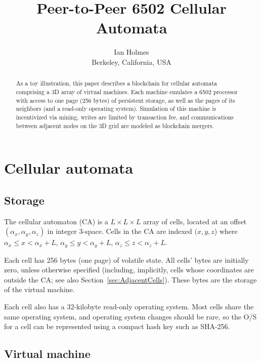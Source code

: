 \documentclass{article}
\begin{document}
\title{Peer-to-Peer 6502 Cellular Automata}
\author{Ian Holmes \\ Berkeley, California, USA}

\maketitle


\begin{abstract}
  As a toy illustration,
  this paper describes a blockchain for cellular automata
  comprising a 3D array of virtual machines.
  Each machine emulates a 6502 processor with access to one page (256 bytes) of persistent storage,
  as well as the pages of its neighbors (and a read-only operating system).
  Simulation of this machine is incentivized via mining,
  writes are limited by transaction fee,
  and communications between adjacent nodes on the 3D grid are modeled as blockchain mergers.
\end{abstract}

\section{Cellular automata}

\subsection{Storage}
\label{sec:Storage}

The cellular automaton (CA) is a $L \times L \times L$ array of cells,
located at an offset $(\alpha_x,\alpha_y,\alpha_z)$ in integer 3-space.
Cells in the CA are indexed $(x,y,z$) where
$\alpha_x \leq x < \alpha_x+L$,
$\alpha_y \leq y < \alpha_y+L$,
$\alpha_z \leq z < \alpha_z+L$.

Each cell has 256 bytes (one page) of volatile state.
All cells' bytes are initially zero, unless otherwise specified
(including, implicitly, cells whose coordinates are outside the CA; see also Section~\ref{sec:AdjacentCells}).
These bytes are the storage of the virtual machine.

Each cell also has a 32-kilobyte read-only operating system.
Most cells share the same operating system, and operating system changes should be rare,
so the O/S for a cell can be represented using a compact hash key such as SHA-256.

\subsection{Virtual machine}
\end{document}
